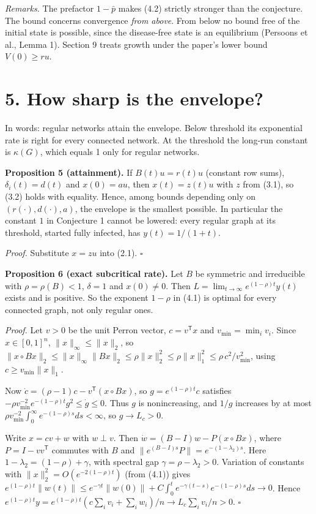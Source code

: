 \documentclass[
  11pt,
  a4paper,
]{article}
\begin{document}
\emph{Remarks.} The prefactor \(1-\bar p\) makes (4.2) strictly stronger
than the conjecture. The bound concerns convergence \emph{from above}.
From below no bound free of the initial state is possible, since the
disease-free state is an equilibrium (Persoons et al., Lemma 1). Section
9 treats growth under the paper's lower bound \(V(0)\ge ru\).

\section{5. How sharp is the envelope?}\label{how-sharp-is-the-envelope}

In words: regular networks attain the envelope. Below threshold its
exponential rate is right for every connected network. At the threshold
the long-run constant is \(\kappa(G)\), which equals 1 only for regular
networks.

\textbf{Proposition 5 (attainment).} If \(B(t)u=r(t)u\) (constant row
sums), \(\delta_i(t)=d(t)\) and \(x(0)=au\), then \(x(t)=z(t)u\) with
\(z\) from (3.1), so (3.2) holds with equality. Hence, among bounds
depending only on \((r(\cdot),d(\cdot),a)\), the envelope is the
smallest possible. In particular the constant \(1\) in Conjecture 1
cannot be lowered: every regular graph at its threshold, started fully
infected, has \(y(t)=1/(1+t)\).

\emph{Proof.} Substitute \(x=zu\) into (2.1). \(\square\)

\textbf{Proposition 6 (exact subcritical rate).} Let \(B\) be symmetric
and irreducible with \(\rho=\rho(B)<1\), \(\delta=1\) and \(x(0)\neq0\).
Then \(L=\lim_{t\to\infty}e^{(1-\rho)t}y(t)\) exists and is positive. So
the exponent \(1-\rho\) in (4.1) is optimal for every connected graph,
not only regular ones.

\emph{Proof.} Let \(v>0\) be the unit Perron vector,
\(c=v^{\mathsf T}x\) and \(v_{\min}=\min_iv_i\). Since \(x\in[0,1]^n\),
\(\|x\|_\infty\le\|x\|_2\), so
\(\|x\circ Bx\|_2\le\|x\|_\infty\|Bx\|_2\le\rho\|x\|_2^2\le\rho\|x\|_1^2\le\rho\,c^2/v_{\min}^2\),
using \(c\ge v_{\min}\|x\|_1\).

Now \(\dot c=(\rho-1)c-v^{\mathsf T}(x\circ Bx)\), so
\(g=e^{(1-\rho)t}c\) satisfies
\(-\rho v_{\min}^{-2}e^{-(1-\rho)t}g^2\le\dot g\le0\). Thus \(g\) is
nonincreasing, and \(1/g\) increases by at most
\(\rho v_{\min}^{-2}\int_0^\infty e^{-(1-\rho)s}ds<\infty\), so
\(g\to L_c>0\).

Write \(x=cv+w\) with \(w\perp v\). Then \(\dot w=(B-I)w-P(x\circ Bx)\),
where \(P=I-vv^{\mathsf T}\) commutes with \(B\) and
\(\|e^{(B-I)s}P\|=e^{-(1-\lambda_2)s}\). Here
\(1-\lambda_2=(1-\rho)+\gamma\), with spectral gap
\(\gamma=\rho-\lambda_2>0\). Variation of constants with
\(\|x\|_2^2=O(e^{-2(1-\rho)t})\) (from (4.1)) gives
\(e^{(1-\rho)t}\|w(t)\|\le e^{-\gamma t}\|w(0)\|+C\int_0^te^{-\gamma(t-s)}e^{-(1-\rho)s}ds\to0\).
Hence
\(e^{(1-\rho)t}y=e^{(1-\rho)t}(c\sum_iv_i+\sum_iw_i)/n\to L_c\sum_iv_i/n>0\).
\(\square\)
\end{document}
